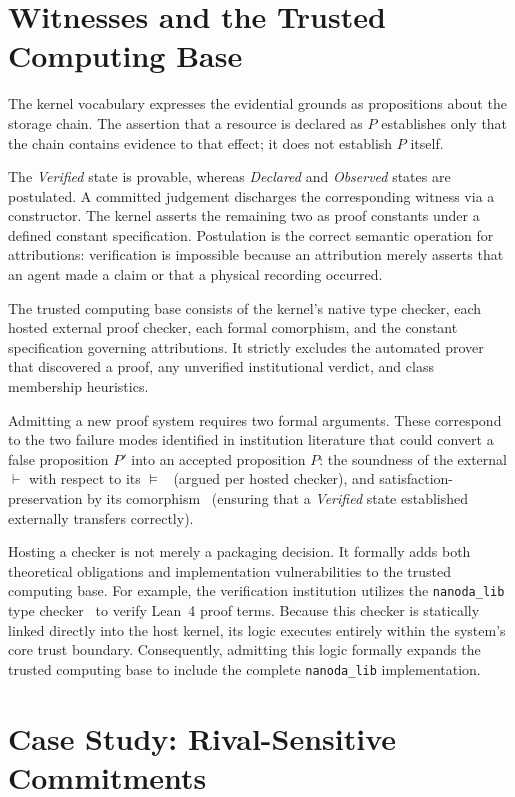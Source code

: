 \documentclass[manuscript,nonacm=true]{acmart}
\newcommand{\code}[1]{\texttt{\small #1}}
\begin{document}
\section{Witnesses and the Trusted Computing Base}

The kernel vocabulary expresses the evidential grounds as propositions about the storage chain. The assertion that a resource is declared as $P$ establishes only that the chain contains evidence to that effect; it does not establish $P$ itself.

The \emph{Verified} state is provable, whereas \emph{Declared} and \emph{Observed} states are postulated. A committed judgement discharges the corresponding witness via a constructor. The kernel asserts the remaining two as proof constants under a defined constant specification. Postulation is the correct semantic operation for attributions: verification is impossible because an attribution merely asserts that an agent made a claim or that a physical recording occurred.

The trusted computing base consists of the kernel's native type checker, each hosted external proof checker, each formal comorphism, and the constant specification governing attributions. It strictly excludes the automated prover that discovered a proof, any unverified institutional verdict, and class membership heuristics.

Admitting a new proof system requires two formal arguments. These correspond to the two failure modes identified in institution literature that could convert a false proposition $P'$ into an accepted proposition $P$: the soundness of the external $\vdash$ with respect to its $\models$~\cite{mes89} (argued per hosted checker), and satisfaction-preservation by its comorphism~\cite{gb92} (ensuring that a \emph{Verified} state established externally transfers correctly).

Hosting a checker is not merely a packaging decision. It formally adds both theoretical obligations and implementation vulnerabilities to the trusted computing base. For example, the verification institution utilizes the \code{nanoda\_lib} type checker~\cite{nanoda} to verify Lean~4 proof terms. Because this checker is statically linked directly into the host kernel, its logic executes entirely within the system's core trust boundary. Consequently, admitting this logic formally expands the trusted computing base to include the complete \code{nanoda\_lib} implementation.

\section{Case Study: Rival-Sensitive Commitments}
\end{document}

